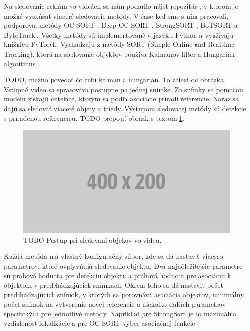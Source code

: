 Na sledovanie reklám vo videách sa nám podarilo nájsť repozitár \cite{mikel}, v ktorom je možné vyskúšať viaceré sledovacie metódy. V čase keď sme s ním pracovali, podporoval metódy OC-SORT \cite{ocsort}, Deep OC-SORT \cite{deepocsort}, StrongSORT \cite{strongsort}, BoTSORT \cite{bot} a ByteTrack \cite{bytetrack}. Všetky metódy sú implementované v jazyku Python a využívajú knižnicu PyTorch. Vychádzajú z metódy SORT (Simple Online and Realtime Tracking), ktorá na sledovanie objektov používa Kalmanov filter a Hungarian algoritmus \cite{sort}.

TODO, možno povedať čo robí kalman a hungarian. To zálezí od obrázka. Vstupné video sa spracováva postupne po jednej snímke. Zo snímky sa pomocou modelu získajú detekcie, ktorým sa podľa asociácie priradí referencie. Naraz sa dajú sa sledovať viaceré objety a triedy. Výstupom sledovacej metódy sú detekcie s priradenou referenciou. TODO prepojiť obrázk s textom \ref{img:tracking}.

 \begin{figure}[ht]
     \centering
     \includegraphics[width=1\textwidth]{images/placeholder.png}
     \caption{TODO Postup pri sledovaní objekov vo videu.}
     \label{img:tracking}
 \end{figure}

Každá metóda má vlastný konfiguračný súbor, kde sa dá nastaviť viacero parametrov, ktoré ovplyvňujú sledovanie objektu. Dva najdôležitejšie parametre sú prahová hodnota pre detekciu objektu a prahová hodnota pre asociáciu k objektom v predchádzajúcich snímkach. Okrem toho sa dá nastaviť počet predchádzajúcich snímok, v ktorých sa porovnáva asociácia objektov, minimálny počet snímok na vytvorenie novej referencie a niekoľko ďalších parametrov špecifických pre jednotlivé metódy. Napríklad pre StrongSort je to maximálna vzdialenosť lokalizácie a pre OC-SORT výber asociačnej funkcie.

